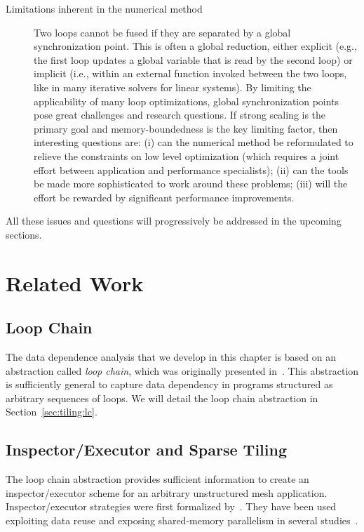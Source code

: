 \begin{description}
\item[Limitations inherent in the numerical method] Two loops cannot be fused if they are separated by a global synchronization point. This is often a global reduction, either explicit (e.g., the first loop updates a global variable that is read by the second loop) or implicit (i.e., within an external function invoked between the two loops, like in many iterative solvers for linear systems). By limiting the applicability of many loop optimizations, global synchronization points pose great challenges and research questions. If strong scaling is the primary goal and memory-boundedness is the key limiting factor, then interesting questions are: (i) can the numerical method be reformulated to relieve the constraints on low level optimization (which requires a joint effort between application and performance specialists); (ii) can the tools be made more sophisticated to work around these problems; (iii) will the effort be rewarded by significant performance improvements.
\end{description}

All these issues and questions will progressively be addressed in the upcoming sections.

\section{Related Work}
\label{sec:tiling:relatedwork}

\subsection*{Loop Chain}
The data dependence analysis that we develop in this chapter is based on an abstraction called \textit{loop chain}, which was originally presented in~\cite{ST-KriegerHIPS2013}. This abstraction is sufficiently general to capture data dependency in programs structured as arbitrary sequences of loops. We will detail the loop chain abstraction in Section~\ref{sec:tiling:lc}.

\subsection*{Inspector/Executor and Sparse Tiling}
The loop chain abstraction provides sufficient information to create an inspector/executor scheme for an arbitrary unstructured mesh application. Inspector/executor strategies were first formalized by~\cite{ST-Saltz91}. They have been used exploiting data reuse and exposing shared-memory parallelism in several studies~\citep{ST-dimeEtna00,ST-StroutLCPC2002,ST-Demmel08,ST-KriegerIAAA2012}. 

